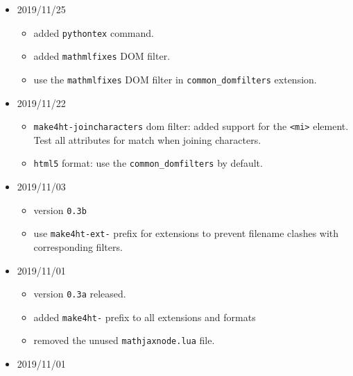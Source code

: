 \begin{itemize}
  \begin{itemize}
  \tightlist
  \item
    version \texttt{0.3c} released.
  \item
    updated \texttt{mathmlfixes} DOM filter. It handles
    \texttt{\textless{}mstyle\textgreater{}} element inside token
    elements now.
  \item
    use \texttt{mathmlfixes} and \texttt{joincharacters} DOM filters for
    math XML files in the ODT output.
  \end{itemize}
\item
  2019/11/25

  \begin{itemize}
  \tightlist
  \item
    added \texttt{pythontex} command.
  \item
    added \texttt{mathmlfixes} DOM filter.
  \item
    use the \texttt{mathmlfixes} DOM filter in
    \texttt{common\_domfilters} extension.
  \end{itemize}
\item
  2019/11/22

  \begin{itemize}
  \tightlist
  \item
    \texttt{make4ht-joincharacters} dom filter: added support for the
    \texttt{\textless{}mi\textgreater{}} element. Test all attributes
    for match when joining characters.
  \item
    \texttt{html5} format: use the \texttt{common\_domfilters} by
    default.
  \end{itemize}
\item
  2019/11/03

  \begin{itemize}
  \tightlist
  \item
    version \texttt{0.3b}
  \item
    use \texttt{make4ht-ext-} prefix for extensions to prevent filename
    clashes with corresponding filters.
  \end{itemize}
\item
  2019/11/01

  \begin{itemize}
  \tightlist
  \item
    version \texttt{0.3a} released.
  \item
    added \texttt{make4ht-} prefix to all extensions and formats
  \item
    removed the unused \texttt{mathjaxnode.lua} file.
  \end{itemize}
\item
  2019/11/01


\end{itemize}
